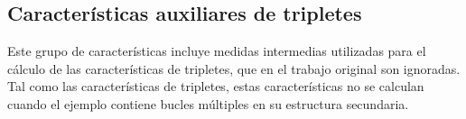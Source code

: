 \subsection{Características auxiliares de tripletes}
Este grupo de características incluye medidas intermedias utilizadas
para el cálculo de las características de tripletes, que en el trabajo
original \cite{xue} son ignoradas.
Tal como las características de tripletes, estas características no se
calculan cuando el ejemplo contiene bucles múltiples en su estructura
secundaria.